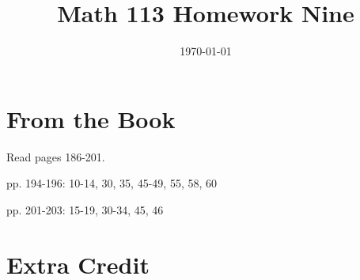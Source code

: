 \documentclass[fleqn,addpoints]{exam}
\title{Math 113 Homework Nine}
\author{}
\date{\today}
\begin{document}
\maketitle

\section{From the Book}

\begin{itemize*}
  \item Read pages 186-201.
  \item pp. 194-196: 10-14, 30, 35, 45-49, 55, 58, 60
  \item pp. 201-203: 15-19, 30-34, 45, 46
\end{itemize*}

\section{Extra Credit}
\end{document}
